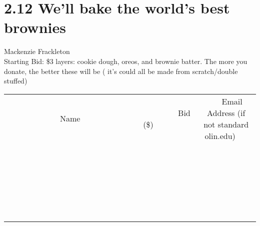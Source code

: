 \documentclass[11pt]{article}
\begin{document}
\section*{2.12 We'll bake the world's best brownies }
Mackenzie Frackleton
\\
Starting Bid: \$3
 layers: cookie dough, oreos, and brownie batter. The more you donate, the better these will be ( it's could all be made from scratch/double stuffed)
\\[6ex]
\begin{tabular}{c c c}
~~~~~~~~~~~~~Name~~~~~~~~~~~~~ & ~~~~~~~~~Bid (\$)~~~~~~~~~  & ~~~Email Address (if not standard olin.edu)~~~\\
 & & \\
\hline
 & & \\
\hline
 & & \\
\hline
 & & \\
\hline
 & & \\
\hline
 & & \\
\hline
 & & \\
\hline
 & & \\
\hline
 & & \\
\hline
 & & \\
\hline
 & & \\
\hline
 & & \\
\hline
 & & \\
\hline
 & & \\
\hline
 & & \\
\hline
 & & \\
\hline
 & & \\
\hline
 & & \\
\hline
 & & \\
\hline
 & & \\
\hline
 & & \\
\hline
 & & \\
\hline
 & & \\
\hline
 & & \\
\hline
 & & \\
\hline
 & & \\
\hline
\end{tabular}
\newpage
\end{document}
